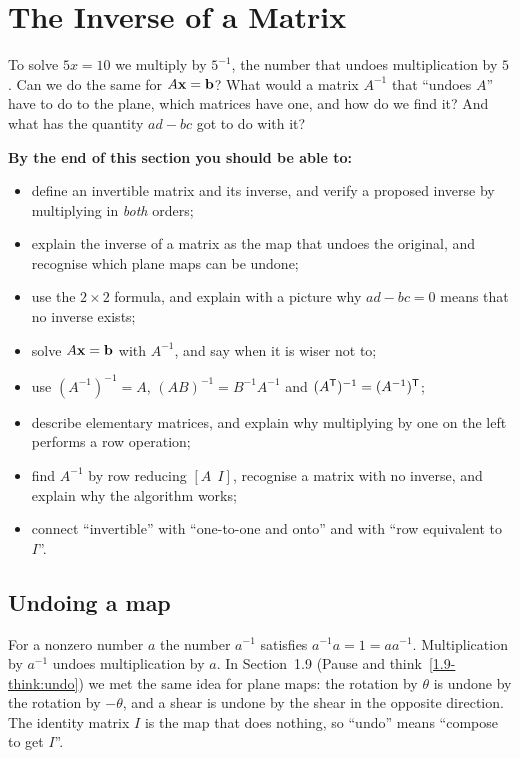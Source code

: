 \documentclass[11pt]{article}
\begin{document}
\section{The Inverse of a Matrix}

\begin{guide}
To solve $5x=10$ we multiply by $5^{-1}$, the number that undoes multiplication by $5$. Can we do the same for $A\mathbf{x}=\mathbf{b}$? What would a matrix $A^{-1}$ that ``undoes $A$'' have to do to the plane, which matrices have one, and how do we find it? And what has the quantity $ad-bc$ got to do with it?
\end{guide}

\textbf{By the end of this section you should be able to:}
\begin{itemize}
  \item define an invertible matrix and its inverse, and verify a proposed inverse by multiplying in \emph{both} orders;
  \item explain the inverse of a matrix as the map that undoes the original, and recognise which plane maps can be undone;
  \item use the $2\times2$ formula, and explain with a picture why $ad-bc=0$ means that no inverse exists;
  \item solve $A\mathbf{x}=\mathbf{b}$ with $A^{-1}$, and say when it is wiser not to;
  \item use $(A^{-1})^{-1}=A$, $(AB)^{-1}=B^{-1}A^{-1}$ and $(A^{\mathsf T})^{-1}=(A^{-1})^{\mathsf T}$;
  \item describe elementary matrices, and explain why multiplying by one on the left performs a row operation;
  \item find $A^{-1}$ by row reducing $[A\ \ I]$, recognise a matrix with no inverse, and explain why the algorithm works;
  \item connect ``invertible'' with ``one-to-one and onto'' and with ``row equivalent to $I$''.
\end{itemize}

\subsection*{Undoing a map}

For a nonzero number $a$ the number $a^{-1}$ satisfies $a^{-1}a=1=aa^{-1}$. Multiplication by $a^{-1}$ undoes multiplication by $a$. In Section~1.9 (Pause and think~\ref{1.9-think:undo}) we met the same idea for plane maps: the rotation by $\theta$ is undone by the rotation by $-\theta$, and a shear is undone by the shear in the opposite direction. The identity matrix $I$ is the map that does nothing, so ``undo'' means ``compose to get $I$''.
\end{document}
